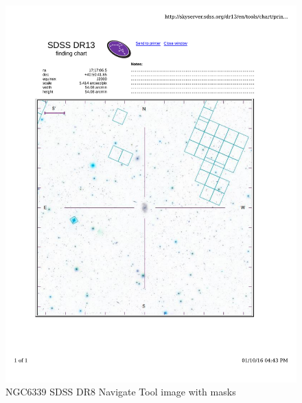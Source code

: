 \documentclass[10pt,letterpaper]{article}
\begin{document}
\begin{figure}[h!]
\centering
\includegraphics[scale=0.7]{figures/NGC6339.pdf}
\caption{NGC6339 SDSS DR8 Navigate Tool image with masks}
\end{figure}
\end{document}

